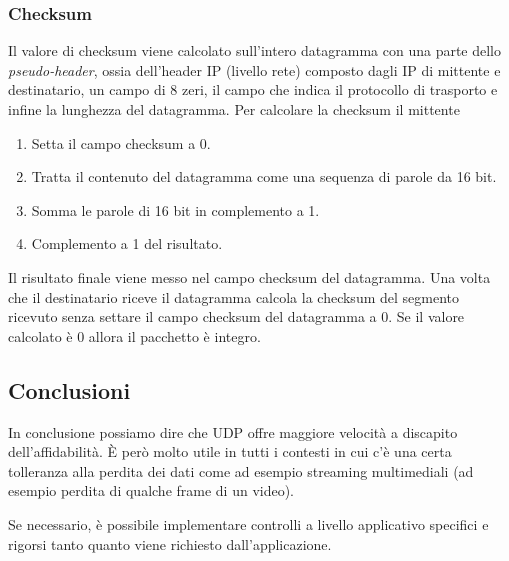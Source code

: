 \subsubsection{Checksum}
Il valore di checksum viene calcolato sull'intero datagramma con una 
parte dello \emph{pseudo-header}, ossia dell'header IP (livello rete) 
composto dagli IP di mittente e destinatario, un campo di 8 zeri, il 
campo che indica il protocollo di trasporto e infine la lunghezza del 
datagramma. Per calcolare la checksum il mittente
\begin{enumerate}
	\item Setta il campo checksum a 0.
	\item Tratta il contenuto del datagramma come una sequenza di 
		parole da 16 bit.
	\item Somma le parole di 16 bit in complemento a 1.
	\item Complemento a 1 del risultato.
\end{enumerate}
Il risultato finale viene messo nel campo checksum del datagramma. Una 
volta che il destinatario riceve il datagramma calcola la checksum del 
segmento ricevuto senza settare il campo checksum del datagramma a 0.
Se il valore calcolato è 0 allora il pacchetto è integro.

\subsection{Conclusioni}
In conclusione possiamo dire che UDP offre maggiore velocità a 
discapito dell'affidabilità. \`E però molto utile in tutti i contesti 
in cui c'è una certa tolleranza alla perdita dei dati come ad esempio 
streaming multimediali (ad esempio perdita di qualche frame di un 
video).

Se necessario, è possibile implementare controlli a livello 
applicativo specifici e rigorsi tanto quanto viene richiesto 
dall'applicazione.

